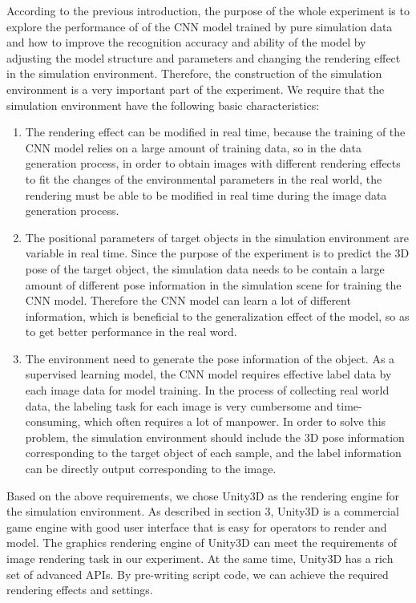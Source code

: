 According to the previous introduction, the purpose of the whole experiment is to explore the performance of of the CNN model trained by pure simulation data and how to improve the recognition accuracy and ability of the model by  adjusting the model structure and parameters and changing the rendering effect in the simulation environment. Therefore, the construction of the simulation environment is a very important part of the experiment. We require that the simulation environment have the following basic characteristics:
\begin{enumerate}
	\item The rendering effect can be modified in real time, because the training of the CNN model relies on a large amount of training data, so in the data generation process, in order to obtain images with different rendering effects to fit the changes of the environmental parameters in the real world, the rendering must be able to be modified in real time during the image data generation process.
	\item The positional parameters of target objects in the simulation environment are variable in real time. Since the purpose of the experiment is to predict the 3D pose of the target object, the simulation data needs to be contain a large amount of different pose information in the simulation scene for training the CNN model. Therefore the CNN model can learn a lot of different information, which is beneficial to the generalization effect of the model, so as to get better performance in the real word.
	\item The environment need to generate the pose information of the object. As a supervised learning model, the CNN model requires effective label data by each image data for model training. In the process of collecting real world data, the labeling task for each image is very cumbersome and time-consuming, which often requires a lot of manpower. In order to solve this problem, the simulation environment should include the 3D pose information corresponding to the target object of each sample, and the label information can be directly output corresponding to the image.
\end{enumerate}
Based on the above requirements, we chose Unity3D as the rendering engine for the simulation environment. As described in section 3, Unity3D is a commercial game engine with good user interface that is easy for operators to render and model. The graphics rendering engine of Unity3D can meet the requirements of image rendering task in our experiment. At the same time, Unity3D has a rich set of advanced APIs.   By pre-writing script code, we can achieve the required rendering effects and settings.


